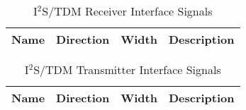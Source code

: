 \begin{table}[H]
  \centering
  \begin{tabular}{|l|l|r|p{8.5cm}|}
    
    \hline
    \rowcolor{iob-green}
    {\bf Name} & {\bf Direction} & {\bf Width} & {\bf Description}  \\ \hline \hline

    
 
  \end{tabular}
  \caption{I$^{2}$S/TDM Receiver Interface Signals}
  \label{rx_is_tab:is}
\end{table}

\begin{table}[H]
  \centering
  \begin{tabular}{|l|l|r|p{8.5cm}|}
    
    \hline
    \rowcolor{iob-green}
    {\bf Name} & {\bf Direction} & {\bf Width} & {\bf Description}  \\ \hline \hline

    
 
  \end{tabular}
  \caption{I$^{2}$S/TDM Transmitter Interface Signals}
  \label{tx_is_tab:is}
\end{table}
